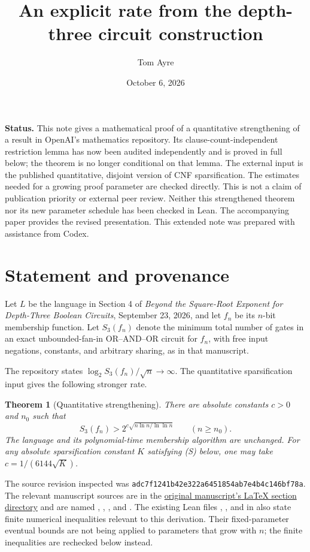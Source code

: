 \documentclass[11pt]{article}
\title{An explicit rate from the depth-three circuit construction}
\author{Tom Ayre}
\date{October 6, 2026}
\newtheorem{theorem}{Theorem}
\begin{document}
\maketitle

\noindent\textbf{Status.}
This note gives a mathematical proof of a quantitative strengthening of a
result in OpenAI's mathematics repository. Its clause-count-independent
restriction lemma has now been audited independently and is proved in full
below; the theorem is no longer conditional on that lemma. The external
input is the published quantitative, disjoint version of CNF sparsification.
The estimates needed for a growing proof parameter are checked directly.
This is not a claim of publication priority or external peer review.
Neither this strengthened theorem nor its new parameter schedule has been
checked in Lean. The accompanying paper provides the revised presentation.
This extended note was prepared with assistance from Codex.

\section{Statement and provenance}

Let $L$ be the language in Section 4 of
\emph{Beyond the Square-Root Exponent for Depth-Three Boolean Circuits},
September 23, 2026, and let $f_n$ be its $n$-bit membership function.
Let $S_3(f_n)$ denote the minimum total number of gates in an exact
unbounded-fan-in OR--AND--OR circuit for $f_n$, with free input negations,
constants, and arbitrary sharing, as in that manuscript.

The repository states $\log_2 S_3(f_n)/\sqrt n\to\infty$.
The quantitative sparsification input gives the following stronger rate.

\begin{theorem}[Quantitative strengthening]
There are absolute constants $c>0$ and $n_0$ such that
\[
 S_3(f_n)>2^{c\sqrt{n\ln n/\ln\ln n}}
 \qquad(n\ge n_0).
\]
The language and its polynomial-time membership algorithm are unchanged.
For any absolute sparsification constant $K$ satisfying (S) below, one may take
$c=1/(6144\sqrt K)$.
\end{theorem}

The source revision inspected was
\texttt{adc7f1241b42e322a6451854ab7e4b4c146bf78a}.
The relevant manuscript sources are in the
\href{https://github.com/openai/math/tree/adc7f1241b42e322a6451854ab7e4b4c146bf78a/preprints/Beyond-the-Square-Root-Exponent-for-Depth-Three-Boolean-Circuits-September-23-2026/build/latex/sections}{original manuscript's LaTeX section directory}
and are named
, ,
, and .
The existing Lean files ,
, and 
in 
also state finite numerical inequalities relevant to this derivation.
Their fixed-parameter eventual bounds are not being applied to parameters
that grow with $n$; the finite inequalities are rechecked below instead.
\end{document}
